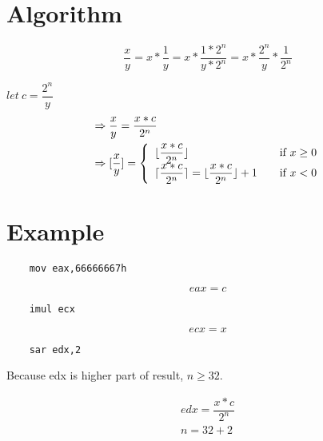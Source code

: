 \documentclass[fleqn]{article}
\DeclarePairedDelimiter\ceil{\lceil}{\rceil}
\DeclarePairedDelimiter\floor{\lfloor}{\rfloor}
\begin{document}

\section{Algorithm}
\begin{equation*}
    \dfrac{x}{y} = x * \dfrac{1}{y} = x * \dfrac{1 * 2^{n}}{y * 2^{n}} = x * \dfrac{2^{n}}{y} * \dfrac{1}{2^{n}}
\end{equation*}

$let\ c = \dfrac{2^{n}}{y}$
\begin{equation*}
    \begin{split}
        &\Rightarrow \dfrac{x}{y} = \dfrac{x * c}{2^{n}} \\
        &\Rightarrow [\frac{x}{y}] =
        \left\{
            \begin{array}{l l}
                \floor{\dfrac{x * c}{2^{n}}} & \quad \text{if $x \ge 0$} \\
                \ceil{\dfrac{x * c}{2^{n}}} = \floor{\dfrac{x * c}{2^{n}}} + 1 & \quad \text{if $x < 0$}
            \end{array}
        \right.
    \end{split}
\end{equation*}

\section{Example}
\begin{lstlisting}
    mov eax,66666667h
\end{lstlisting}
\begin{equation*}
    eax = c
\end{equation*}

\begin{lstlisting}
    imul ecx
\end{lstlisting}
\begin{equation*}
    ecx = x
\end{equation*}

\begin{lstlisting}
    sar edx,2
\end{lstlisting}

Because edx is higher part of result, $n \ge 32$.

\begin{align*}
    edx = \dfrac{x * c}{2^{n}} \\
    n = 32 + 2
\end{align*}
\end{document}
